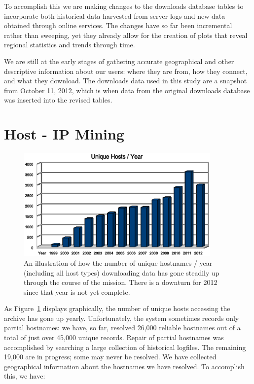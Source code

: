To accomplish this we are making changes to the downloads database tables to incorporate both historical data harvested from server logs and new data obtained through online services. The changes have so far been incremental rather than sweeping, yet they already allow for the creation of plots that reveal regional statistics and trends through time.

We are still at the early stages of gathering accurate geographical and other descriptive information about our users: where they are from, how they connect, and what they download. The downloads data used in this study are a snapshot from October 11, 2012, which is when data from the original downloads database was inserted into the revised tables.

\section{Host - IP Mining}

\begin{figure}[H]
\begin{center}
\includegraphics[width=100mm]{part6/Becker_P41/hosts_year.eps}
\end{center}
\caption{An illustration of how the number of unique hostnames / year (including all host types) downloading data has gone steadily up through the course of the mission. There is a downturn for 2012 since that year is not yet complete.}
\label{fig:HostsByYear}
\end{figure}

As Figure~\ref{fig:HostsByYear} displays graphically, the number of unique hosts accessing the archive has gone up yearly. Unfortunately, the system sometimes records only partial hostnames: we have, so far, resolved 26,000 reliable hostnames out of a total of just over 45,000 unique records. Repair of partial hostnames was accomplished by searching a large collection of historical logfiles. The remaining 19,000 are in progress; some may never be resolved. We have collected geographical information about the hostnames we have resolved. To accomplish this, we have:

